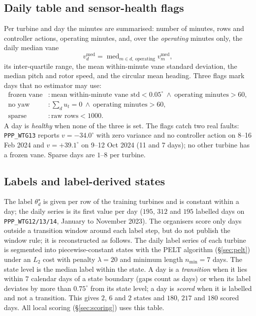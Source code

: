\documentclass[11pt,a4paper]{article}
\theoremstyle{remark}
\newcommand{\med}{\operatorname{med}}
\newcommand{\dg}{^{\circ}}
\newcommand{\code}[1]{\texttt{#1}}
\begin{document}
\subsection{Daily table and sensor-health flags}\label{sec:health}
Per turbine and day the minutes are summarised: number of minutes, rows and
controller actions, operating minutes, and, over the
\emph{operating} minutes only, the daily median vane
\begin{equation}
  v^{\med}_d = \med_{m\in d,\ \text{operating}} v^{\med}_m ,
  \label{eq:vane_daily}
\end{equation}
its inter-quartile range, the mean within-minute vane standard deviation, the
median pitch and rotor speed, and the circular mean heading. Three flags mark
days that no estimator may use:
\begin{align*}
  \text{frozen vane} &: \text{mean within-minute vane std} < 0.05\dg \ \wedge\ \text{operating minutes} > 60,\\
  \text{no yaw}      &: \textstyle\sum_d u_t = 0 \ \wedge\ \text{operating minutes} > 60,\\
  \text{sparse}      &: \text{raw rows} < 1000 .
\end{align*}
A day is \emph{healthy} when none of the three is set. The flags catch two real
faults: \code{PPP\_WTG13} reports $v=-34.0\dg$ with zero variance and no
controller action on 8--16 Feb 2024 and $v=+39.1\dg$ on 9--12 Oct 2024 (11 and 7
days); no other turbine has a frozen vane. Sparse days are $1$--$8$ per turbine.

\subsection{Labels and label-derived states}\label{sec:labels}
The label $\theta^\star_d$ is given per row of the training turbines and is
constant within a day; the daily series is its first value per day
($195$, $312$ and $195$ labelled days on \code{PPP\_WTG12/13/14}, January to
November 2023). The organisers score only days outside a transition window
around each label step, but do not publish the window rule; it is reconstructed
as follows. The daily label series of each turbine is segmented into
piecewise-constant states with the PELT algorithm (\S\ref{sec:pelt}) under an
$L_2$ cost with penalty $\lambda=20$ and minimum length $n_{\min}=7$ days. The
state level is the median label within the state. A day is a \emph{transition}
when it lies within $7$ calendar days of a state boundary (gaps count as days)
or when its label deviates by more than $0.75\dg$ from its state level; a day is
\emph{scored} when it is labelled and not a transition. This gives $2$, $6$ and
$2$ states and $180$, $217$ and $180$ scored days. All local scoring
(\S\ref{sec:scoring}) uses this table.
\end{document}
